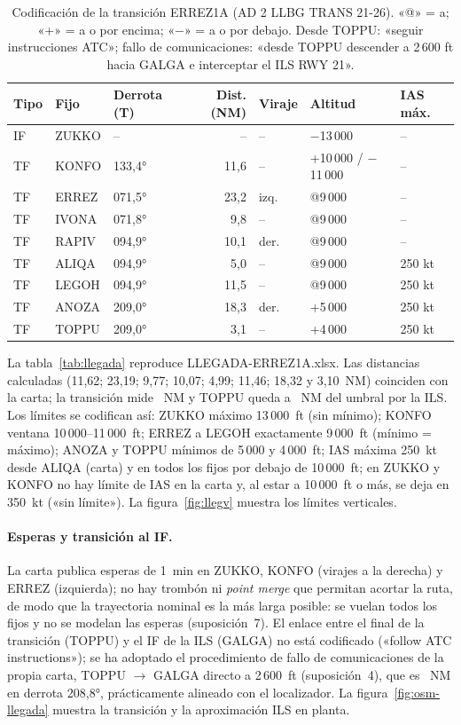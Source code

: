\documentclass[11pt,a4paper]{article}
\DeclareRobustCommand{\m}[1]{{\ttfamily\def\_{\textunderscore\penalty100\relax}#1}}
\begin{document}
\begin{table}[H]\centering\small
\begin{tabular}{lllrlll}\toprule
Tipo & Fijo & Derrota (T) & Dist. (NM) & Viraje & Altitud & IAS máx.\\ \midrule
IF & ZUKKO & -- & -- & -- & $-$13\,000 & --\\
TF & KONFO & 133,4° & 11,6 & -- & +10\,000 / $-$11\,000 & --\\
TF & ERREZ & 071,5° & 23,2 & izq. & @9\,000 & --\\
TF & IVONA & 071,8° & 9,8 & -- & @9\,000 & --\\
TF & RAPIV & 094,9° & 10,1 & der. & @9\,000 & --\\
TF & ALIQA & 094,9° & 5,0 & -- & @9\,000 & 250 kt\\
TF & LEGOH & 094,9° & 11,5 & -- & @9\,000 & 250 kt\\
TF & ANOZA & 209,0° & 18,3 & der. & +5\,000 & 250 kt\\
TF & TOPPU & 209,0° & 3,1 & -- & +4\,000 & 250 kt\\ \bottomrule
\end{tabular}
\caption{Codificación de la transición ERREZ1A (AD 2 LLBG TRANS 21-26). «@» = a; «+» = a o por encima; «$-$» = a o por debajo. Desde TOPPU: «seguir instrucciones ATC»; fallo de comunicaciones: «desde TOPPU descender a 2\,600 ft hacia GALGA e interceptar el ILS RWY 21».}
\label{tab:transcarta}
\end{table}

La tabla~\ref{tab:llegada} reproduce \m{LLEGADA-ERREZ1A.xlsx}. Las distancias calculadas (11,62; 23,19; 9,77; 10,07; 4,99; 11,46; 18,32 y 3,10~NM) coinciden con la carta; la transición mide \arrDist~NM y TOPPU queda a \arrToppuRest~NM del umbral por la ILS. Los límites se codifican así: ZUKKO máximo 13\,000~ft (sin mínimo); KONFO ventana 10\,000--11\,000~ft; ERREZ a LEGOH exactamente 9\,000~ft (mínimo = máximo); ANOZA y TOPPU mínimos de 5\,000 y 4\,000~ft; IAS máxima 250~kt desde ALIQA (carta) y en todos los fijos por debajo de 10\,000~ft; en ZUKKO y KONFO no hay límite de IAS en la carta y, al estar a 10\,000~ft o más, se deja en 350~kt («sin límite»). La figura~\ref{fig:llegv} muestra los límites verticales.

\paragraph{Esperas y transición al IF.} La carta publica esperas de 1~min en ZUKKO, KONFO (virajes a la derecha) y ERREZ (izquierda); no hay trombón ni \emph{point merge} que permitan acortar la ruta, de modo que la trayectoria nominal es la más larga posible: se vuelan todos los fijos y no se modelan las esperas (suposición~7). El enlace entre el final de la transición (TOPPU) y el IF de la ILS (GALGA) no está codificado («follow ATC instructions»); se ha adoptado el procedimiento de fallo de comunicaciones de la propia carta, TOPPU $\rightarrow$ GALGA directo a 2\,600~ft (suposición~4), que es \ilsGalgaLeg~NM en derrota 208,8°, prácticamente alineado con el localizador. La figura~\ref{fig:osm-llegada} muestra la transición y la aproximación ILS en planta.
\end{document}
